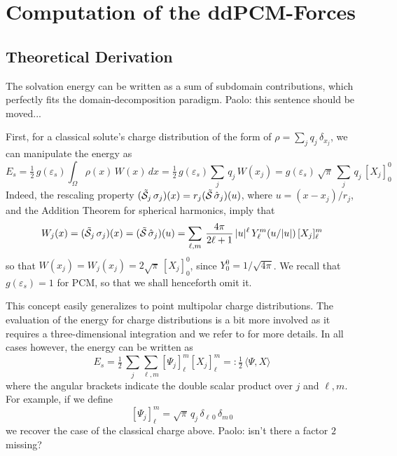 \section{Computation of the ddPCM-Forces}\label{sec:forces}

\subsection{Theoretical Derivation}
The solvation energy can be written as a sum of subdomain contributions, which perfectly fits the domain-decomposition paradigm. {\color{red} Paolo: this sentence should be moved...}

First, for a classical solute's charge distribution of the form of $\rho=\sum_j q_j \, \delta_{x_j}$, we can manipulate the energy as
\[
	E_s 
	= \tfrac{1}{2} \, g(\varepsilon_s)  \int_{\Omega} \rho(x) \, W(x) \, dx
	= \tfrac{1}{2} \, g(\varepsilon_s) \sum_j \, q_j \,  W(x_j)
	= g(\varepsilon_s) \,{\sqrt{\pi}}\, \sum_j  \,q_j \, [X_j]_0^0
\]
Indeed, the rescaling property $(\tilde{\mathcal{S}}_j \, \sigma_j)(x) = r_j (\tilde{\mathcal{S}} \, \hat{\sigma}_j)(u)$, where $u = (x-x_j)/r_j$, and the Addition Theorem for spherical harmonics, imply that
\[
W_j(x) = (\tilde{\mathcal{S}}_j \, \sigma_j)(x) = (\tilde{\mathcal{S}} \, \hat{\sigma}_j)(u) = \sum_{\ell,m} \, \frac{4\pi}{ 2\ell + 1} \, |u|^\ell \, Y_\ell^m(u/|u|) \, [X_j]_\ell^m
\]
so that $W(x_j) = W_j(x_j) = 2 \sqrt{\pi} \, [X_j]_0^0$, since $Y_0^0 = 1/ \sqrt{4\pi}$. We recall that $g(\varepsilon_s) =1$ for PCM, so that we shall henceforth omit it.

This concept easily generalizes to point multipolar charge distributions. 
The evaluation of the energy for charge distributions is a bit more involved as it requires a three-dimensional integration and we refer to \cite{Lipparini_JCP_ddCOSMO-QM} for more details. In all cases however, the energy can be written as
\[
E_s = \tfrac{1}{2}
 \, \sum_j \sum_{\ell,m} [\Psi_j]_\ell^m [X_j]_\ell^m
  =: \tfrac{1}{2} 
  \,\langle \Psi, X \rangle
\]
where the angular brackets indicate the double scalar product over $j$ and $\ell,m$.
For example, if we define
\[
	[\Psi_j]_\ell^m = {\sqrt{\pi}}\, q_j \, \delta_{\ell\,0} \,\delta_{m\,0}
\]
we recover the case of  the classical charge above. {\color{red}Paolo: isn't there a factor $2$ missing?}

